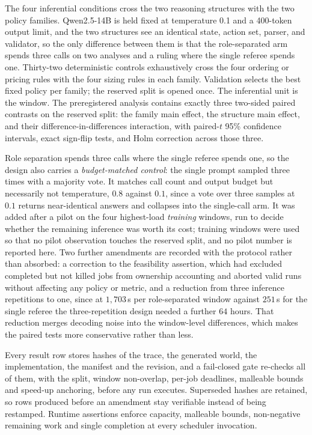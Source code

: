 \documentclass[conference]{IEEEtran}
\begin{document}
The four inferential conditions cross the two reasoning structures with the two policy families.
Qwen2.5-14B is held fixed at temperature 0.1 and a 400-token output limit, and the two structures see
an identical state, action set, parser, and validator, so the only difference between them is that the
role-separated arm spends three calls on two analyses and a ruling where the single referee spends one.
Thirty-two deterministic controls exhaustively cross the four ordering or pricing rules with the four
sizing rules in each family.  Validation selects the best fixed policy per family; the reserved split
is opened once.  The inferential unit is the window.  The preregistered analysis contains exactly three
two-sided paired contrasts on the reserved split: the family main effect, the structure main effect,
and their difference-in-differences interaction, with paired-$t$ 95\% confidence intervals, exact
sign-flip tests, and Holm correction across those three.

Role separation spends three calls where the single referee spends one, so the design also carries a
\emph{budget-matched control}: the single prompt sampled three times with a majority vote.  It matches
call count and output budget but necessarily not temperature, $0.8$ against $0.1$, since a vote over
three samples at $0.1$ returns near-identical answers and collapses into the single-call arm.  It was
added after a pilot on the four highest-load \emph{training} windows, run to decide whether the
remaining inference was worth its cost; training windows were used so that no pilot observation touches
the reserved split, and no pilot number is reported here.  Two further amendments are recorded with the
protocol rather than absorbed: a correction to the feasibility assertion, which had excluded completed
but not killed jobs from ownership accounting and aborted valid runs without affecting any policy or
metric, and a reduction from three inference repetitions to one, since at $1{,}703$\,s per
role-separated window against $251$\,s for the single referee the three-repetition design needed a
further $64$ hours.  That reduction merges decoding noise into the window-level differences, which makes
the paired tests more conservative rather than less.

Every result row stores hashes of the trace, the generated world, the implementation, the manifest and
the revision, and a fail-closed gate re-checks all of them, with the split, window non-overlap, per-job
deadlines, malleable bounds and speed-up anchoring, before any run executes.  Superseded hashes are
retained, so rows produced before an amendment stay verifiable instead of being restamped.  Runtime
assertions enforce capacity, malleable bounds, non-negative remaining work and single completion at
every scheduler invocation.
\end{document}
